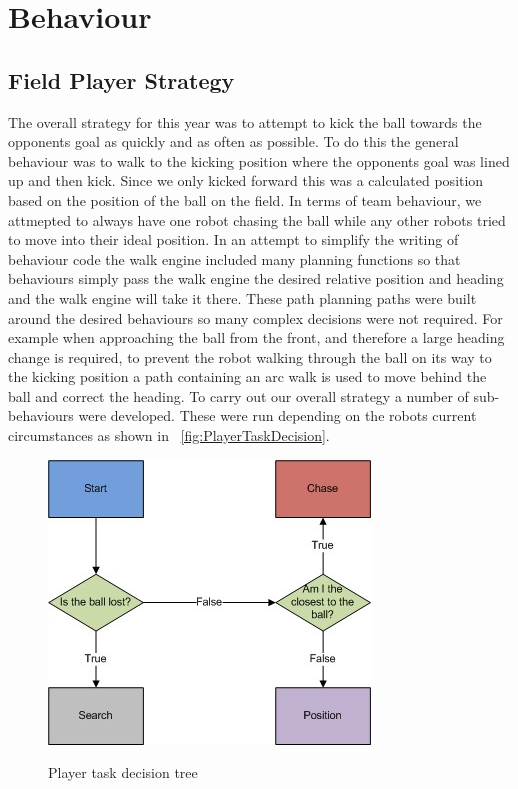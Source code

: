 \section{Behaviour}
\label{Behaviour}
\subsection{Field Player Strategy}
The overall strategy for this year was to attempt to kick the ball towards the opponents goal as quickly and as often as possible. To do this the general behaviour was to walk to the kicking position where the opponents goal was lined up and then kick. Since we only kicked forward this was a calculated position based on the position of the ball on the field. In terms of team behaviour, we attmepted to always have one robot chasing the ball while any other robots tried to move into their ideal position. In an attempt to simplify the writing of behaviour code the walk engine included many planning functions so that behaviours simply pass the walk engine the desired relative position and heading and the walk engine will take it there. These path planning paths were built around the desired behaviours so many complex decisions were not required. For example when approaching the ball from the front, and therefore a large heading change is required, to prevent the robot walking through the ball on its way to the kicking position a path containing an arc walk is used to move behind the ball and correct the heading. To carry out our overall strategy a number of sub-behaviours were developed. These were run depending on the robots current circumstances as shown in ~\autoref{fig:PlayerTaskDecision}.

\begin{figure}[!h]
\begin{center}
   \leavevmode
    \scalebox{0.8} {\includegraphics{figs/FieldPlayerTaskDecision.jpg} }
    \caption{Player task decision tree}
    \label{fig:PlayerTaskDecision}
\end{center}
\end{figure}



